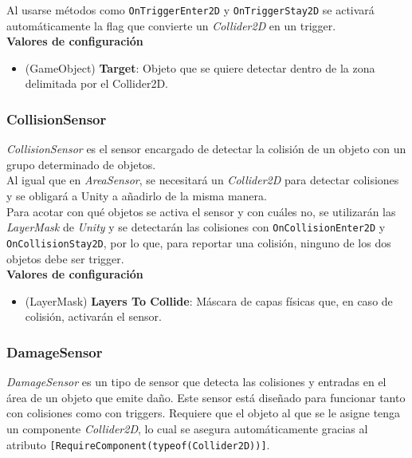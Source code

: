 Al usarse métodos como \texttt{OnTriggerEnter2D} y \texttt{OnTriggerStay2D} se activará automáticamente la flag que convierte un \textit{Collider2D} en un trigger.\\

\textbf{Valores de configuración}
\begin{itemize}
	\item (GameObject) \textbf{Target}: Objeto que se quiere detectar dentro de la zona delimitada por el Collider2D.
\end{itemize}

\subsubsection{CollisionSensor}

\textit{CollisionSensor} es el sensor encargado de detectar la colisión de un objeto con un grupo determinado de objetos.\\

Al igual que en \textit{AreaSensor}, se necesitará un \textit{Collider2D} para detectar colisiones y se obligará a Unity a añadirlo de la misma manera.\\

Para acotar con qué objetos se activa el sensor y con cuáles no, se utilizarán las \textit{LayerMask} de \textit{Unity} y se detectarán las colisiones con \texttt{OnCollisionEnter2D} y \texttt{OnCollisionStay2D}, por lo que, para reportar una colisión, ninguno de los dos objetos debe ser trigger.\\

\textbf{Valores de configuración}
\begin{itemize}
	\item (LayerMask) \textbf{Layers To Collide}: Máscara de capas físicas que, en caso de colisión, activarán el sensor.
\end{itemize}

\subsubsection{DamageSensor}

\textit{DamageSensor} es un tipo de sensor que detecta las colisiones y entradas en el área de un objeto que emite daño. Este sensor está diseñado para funcionar tanto con colisiones como con triggers. Requiere que el objeto al que se le asigne tenga un componente \textit{Collider2D}, lo cual se asegura automáticamente gracias al atributo \texttt{[RequireComponent(typeof(Collider2D))]}.\\

